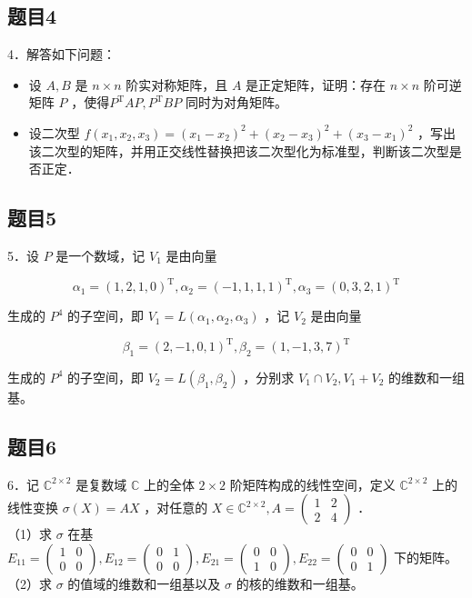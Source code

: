 \documentclass{article}
\begin{document}
\subsection{题目4}
4．解答如下问题：

\begin{itemize}
  \item[（1）] 设 \(A, B\) 是 \(n \times n\) 阶实对称矩阵，且 \(A\) 是正定矩阵，证明：存在 \(n \times n\) 阶可逆矩阵 \(P\) ，使得\(P^{\mathrm{T}} A P, P^{\mathrm{T}} B P\) 同时为对角矩阵。
  \item[（2）] 设二次型 \(f\left(x_{1}, x_{2}, x_{3}\right)=\left(x_{1}-x_{2}\right)^{2}+\left(x_{2}-x_{3}\right)^{2}+\left(x_{3}-x_{1}\right)^{2}\) ，写出该二次型的矩阵，并用正交线性替换把该二次型化为标准型，判断该二次型是否正定．
\end{itemize}

\subsection{题目5}
5．设 \(P\) 是一个数域，记 \(V_{1}\) 是由向量

\[
\alpha_{1}=(1,2,1,0)^{\mathrm{T}}, \alpha_{2}=(-1,1,1,1)^{\mathrm{T}}, \alpha_{3}=(0,3,2,1)^{\mathrm{T}}
\]

生成的 \(P^{4}\) 的子空间，即 \(V_{1}=L\left(\alpha_{1}, \alpha_{2}, \alpha_{3}\right)\) ，记 \(V_{2}\) 是由向量

\[
\beta_{1}=(2,-1,0,1)^{\mathrm{T}}, \beta_{2}=(1,-1,3,7)^{\mathrm{T}}
\]

生成的 \(P^{4}\) 的子空间，即 \(V_{2}=L\left(\beta_{1}, \beta_{2}\right)\) ，分别求 \(V_{1} \cap V_{2}, V_{1}+V_{2}\) 的维数和一组基。

\subsection{题目6}
6．记 \(\mathbb{C}^{2 \times 2}\) 是复数域 \(\mathbb{C}\) 上的全体 \(2 \times 2\) 阶矩阵构成的线性空间，定义 \(\mathbb{C}^{2 \times 2}\) 上的线性变换 \(\sigma(X)=A X\) ，对任意的 \(X \in \mathbb{C}^{2 \times 2}, A=\left(\begin{array}{ll}1 & 2 \\ 2 & 4\end{array}\right)\) ．\\
（1）求 \(\sigma\) 在基 \(E_{11}=\left(\begin{array}{ll}1 & 0 \\ 0 & 0\end{array}\right), E_{12}=\left(\begin{array}{ll}0 & 1 \\ 0 & 0\end{array}\right), E_{21}=\left(\begin{array}{ll}0 & 0 \\ 1 & 0\end{array}\right), E_{22}=\left(\begin{array}{ll}0 & 0 \\ 0 & 1\end{array}\right)\) 下的矩阵。\\
（2）求 \(\sigma\) 的值域的维数和一组基以及 \(\sigma\) 的核的维数和一组基。
\end{document}
